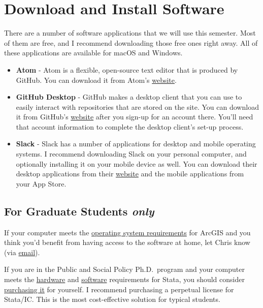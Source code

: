 \documentclass[]{book}
\providecommand{\tightlist}{%
  \setlength{\itemsep}{0pt}\setlength{\parskip}{0pt}}
\begin{document}
\section{Download and Install
Software}\label{download-and-install-software}

There are a number of software applications that we will use this
semester. Most of them are free, and I recommend downloading those free
ones right away. All of these applications are available for macOS and
Windows.

\begin{itemize}
\tightlist
\item
  \textbf{Atom} - Atom is a flexible, open-source text editor that is
  produced by GitHub. You can download it from Atom's
  \href{https://atom.io}{website}.
\item
  \textbf{GitHub Desktop} - GitHub makes a desktop client that you can
  use to easily interact with repositories that are stored on the site.
  You can download it from GitHub's
  \href{https://desktop.github.com}{website} after you sign-up for an
  account there. You'll need that account information to complete the
  desktop client's set-up process.
\item
  \textbf{Slack} - Slack has a number of applications for desktop and
  mobile operating systems. I recommend downloading Slack on your
  personal computer, and optionally installing it on your mobile device
  as well. You can download their desktop applications from their
  \href{https://slack.com/downloads}{website} and the mobile
  applications from your App Store.
\end{itemize}

\subsection*{\texorpdfstring{For Graduate Students
\emph{only}}{For Graduate Students only}}\label{for-graduate-students-only}

If your computer meets the
\href{http://desktop.arcgis.com/en/arcmap/10.3/get-started/system-requirements/arcgis-desktop-system-requirements.htm}{operating
system requirements} for ArcGIS and you think you'd benefit from having
access to the software at home, let Chris know (via
\href{mailto:prenercg@slu.edu}{email}).

If you are in the Public and Social Policy Ph.D.~program and your
computer meets the
\href{http://www.stata.com/support/faqs/windows/hardware-requirements/}{hardware}
and
\href{http://www.stata.com/products/compatible-operating-systems/}{software}
requirements for Stata, you should consider
\href{https://www.stata.com/order/new/edu/gradplans/student-pricing/}{purchasing
it} for yourself. I recommend purchasing a perpetual license for
Stata/IC. This is the most cost-effective solution for typical students.
\end{document}
